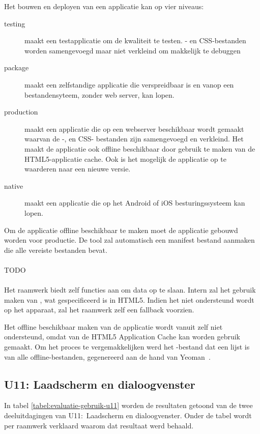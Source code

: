 Het bouwen en deployen van een applicatie kan op vier niveaus:
\begin{description}
  \item [testing] maakt een testapplicatie om de kwaliteit te testen.  \js- en CSS-bestanden worden samengevoegd maar niet verkleind om makkelijk te debuggen
  \item [package] maakt een zelfstandige applicatie die verspreidbaar is en vanop een bestandensyteem,  zonder web server,  kan lopen.
  \item [production] maakt een applicatie die op een webserver beschikbaar wordt gemaakt waarvan de \js-, en CSS- bestanden zijn samengevoegd en verkleind.  Het maakt de applicatie ook offline beschikbaar door gebruik te maken van de HTML5-applicatie cache.  Ook is het mogelijk de applicatie op te waarderen naar een nieuwe versie.
  \item [native] maakt een  applicatie die op het Android of iOS besturingssysteem kan lopen.
\end{description}
Om de applicatie offline beschikbaar te maken moet de applicatie gebouwd worden voor productie.
De tool zal automatisch een manifest bestand aanmaken die alle vereiste bestanden bevat.

\paragraph{\kendo}
TODO

\paragraph{\lungo}
Het raamwerk biedt zelf functies aan om data op te slaan.
Intern zal het gebruik maken van , wat gespecificeerd is in HTML5.
Indien het niet ondersteund wordt op het apparaat, zal het raamwerk zelf een fallback voorzien.

Het offline beschikbaar maken van de applicatie wordt vanuit \lungo{} zelf niet ondersteund, omdat van de HTML5 Application Cache kan worden gebruik gemaakt.
Om het proces te vergemakkelijken werd het -bestand dat een lijst is van alle offline-bestanden, gegenereerd aan de hand van Yeoman~\cite{Yeoman2013}.

\subsection{U11: Laadscherm en dialoogvenster} 
In tabel \ref{tabel:evaluatie-gebruik-u11} worden de resultaten getoond van de twee deeluitdagingen van U11:~Laadscherm en dialoogvenster.
Onder de tabel wordt per raamwerk verklaard waarom dat resultaat werd behaald.


